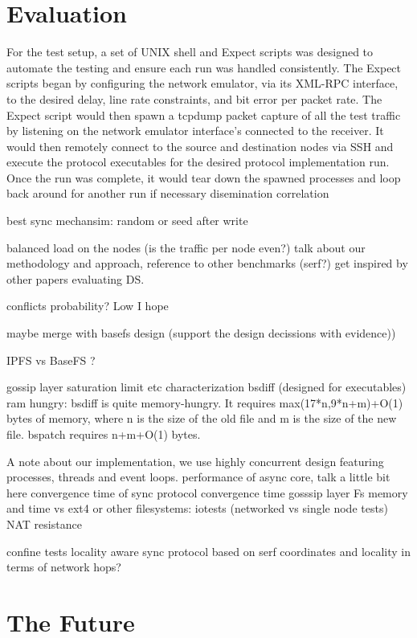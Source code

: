 \documentclass{sig-alternate}
\begin{document}
\section{Evaluation}

For the test setup, a set of UNIX shell and Expect scripts 
was designed to automate the testing and ensure each run was 
handled consistently. The Expect scripts began by configuring 
the network emulator, via its XML-RPC interface, to the 
desired delay, line rate constraints, and bit error per packet 
rate. The Expect script would then spawn a tcpdump packet 
capture of all the test traffic by listening on the network 
emulator interface’s connected to the receiver. It would then 
remotely connect to the source and destination nodes via SSH 
and execute the protocol executables for the desired protocol 
implementation run. Once the run was complete, it would tear 
down the spawned processes and loop back around for another 
run if necessary
disemination
correlation




best sync mechansim: random or seed after write

balanced load on the nodes (is the traffic per node even?)
talk about our methodology and approach, reference to other benchmarks (serf?) get inspired by other papers evaluating DS. 

conflicts probability? Low I hope

maybe merge with basefs design (support the design decissions with evidence))

IPFS vs BaseFS ?

gossip layer saturation limit
etc characterization
    bsdiff (designed for executables) ram hungry: bsdiff is quite memory-hungry. It requires max(17*n,9*n+m)+O(1) bytes of memory, where n is the size of the old file and m is the size of the new file. bspatch requires n+m+O(1) bytes.

A note about our implementation, we use highly concurrent design featuring processes, threads and event loops. performance of async core, talk a little bit here
convergence time of sync protocol
convergence time gosssip layer
Fs memory and time vs ext4 or other filesystems: iotests (networked vs single node tests)
NAT resistance

confine tests
locality aware sync protocol based on serf coordinates
and locality in terms of network hops?



\section{The Future}
\end{document}
